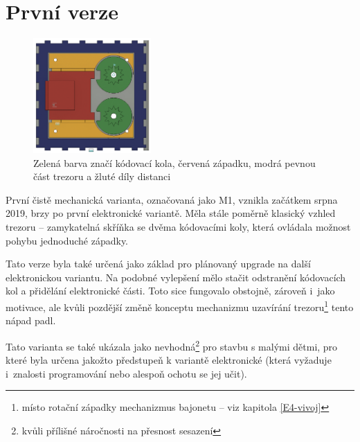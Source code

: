 \section{První verze}
\label{M1-vyvoj}

\begin{figure}
    \centering
    \includegraphics[width=0.4\textwidth]{kapitoly/obrazky/M1/mechanizmus.png}
    \caption{Zelená barva značí kódovací kola, červená západku, modrá pevnou část trezoru a žluté díly distanci \centering}
    \label{fig:M1-mechanizmus}
\end{figure}
První čistě mechanická varianta, označovaná jako M1, vznikla začátkem srpna 2019, brzy po první  elektronické variantě.
Měla stále poměrně klasický vzhled trezoru -- zamykatelná skříňka se dvěma  kódovacími koly, která ovládala možnost pohybu jednoduché západky.

Tato verze byla také určená jako základ pro plánovaný upgrade na další elektronickou
variantu. Na podobné vylepšení mělo stačit odstranění kódo\-va\-cích kol a přidělání elektronické části. Toto sice fungovalo obstojně, zároveň 
i~jako motivace, ale kvůli pozdější změně konceptu mechanizmu uzavírání trezoru\footnote{místo rotační západky mechanizmus bajonetu -- viz 
kapitola \ref{E4-vivoj}} tento nápad padl.

Tato varianta se také ukázala jako nevhodná\footnote{kvůli přílišné náročnosti na přesnost sesazení} pro stavbu s malými dětmi, 
pro které byla určena jakožto předstupeň k variantě elektronické (která vyžaduje i~znalosti programování nebo alespoň ochotu se jej učit).

\newpage